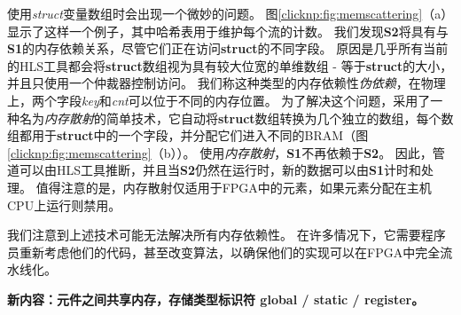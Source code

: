 使用\textit {struct}变量数组时会出现一个微妙的问题。
图\ref {clicknp:fig:memscattering}（a）显示了这样一个例子，其中哈希表用于维护每个流的计数。
我们发现\textbf {S2}将具有与\textbf {S1}的内存依赖关系，尽管它们正在访问\textbf {struct}的不同字段。
原因是几乎所有当前的HLS工具都会将\textbf {struct}数组视为具有较大位宽的单维数组 - 等于\textbf {struct}的大小，并且只使用一个仲裁器控制访问。
我们称这种类型的内存依赖性\textit {伪依赖}，在物理上，两个字段\textit {key}和\textit {cnt}可以位于不同的内存位置。
为了解决这个问题，\name 采用了一种名为\textit {内存散射}的简单技术，它自动将\textbf {struct}数组转换为几个独立的数组，每个数组都用于\textbf {struct}中的一个字段，并分配它们进入不同的BRAM（图 \ref {clicknp:fig:memscattering}（b））。
使用\textit {内存散射}，\textbf {S1}不再依赖于\textbf {S2}。
因此，管道可以由HLS工具推断，并且当\textbf {S2}仍然在运行时，新的数据可以由\textbf {S1}计时和处理。
值得注意的是，内存散射仅适用于FPGA中的元素，如果元素分配在主机CPU上运行则禁用。

我们注意到上述技术可能无法解决所有内存依赖性。
在许多情况下，它需要程序员重新考虑他们的代码，甚至改变算法，以确保他们的实现可以在FPGA中完全流水线化。


\textbf{新内容：元件之间共享内存，存储类型标识符 global / static / register。}

